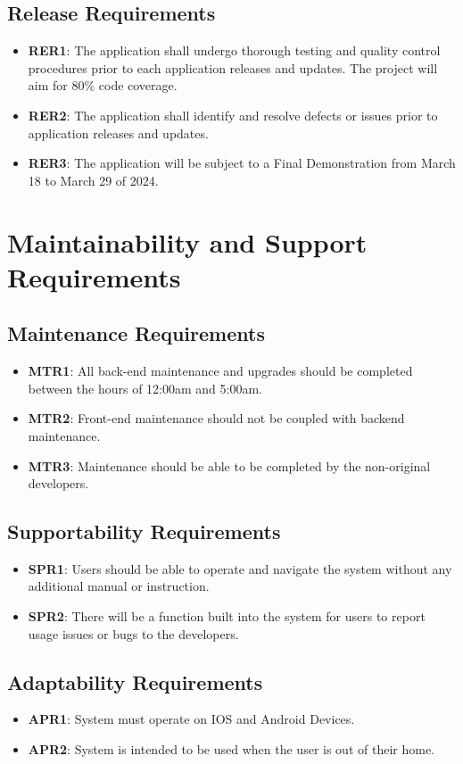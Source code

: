 \documentclass[12pt]{article}
\begin{document}
\subsection{Release Requirements}
\begin{itemize}
    \item \textbf{RER1}: The application shall undergo thorough testing and quality control procedures prior to each application releases and updates. The project will aim for 80\% code coverage.
    \item \textbf{RER2}: The application shall identify and resolve defects or issues prior to application releases and updates.
    \item \textbf{RER3}: The application will be subject to a Final Demonstration from March 18 to March 29 of 2024.
\end{itemize}

\section{Maintainability and Support Requirements}
\subsection{Maintenance Requirements}
\begin{itemize}
  \item \textbf{MTR1}: All back-end maintenance and upgrades should be completed between the hours of 12:00am and 5:00am.
  \item \textbf{MTR2}: Front-end maintenance should not be coupled with backend maintenance.
  \item \textbf{MTR3}: Maintenance should be able to be completed by the non-original developers.
\end{itemize}
\subsection{Supportability Requirements}
\begin{itemize}
  \item \textbf{SPR1}: Users should be able to operate and navigate the system without any additional manual or instruction.
  \item \textbf{SPR2}: There will be a function built into the system for users to report usage issues or bugs to the developers.
\end{itemize}
\subsection{Adaptability Requirements}
\begin{itemize}
  \item \textbf{APR1}: System must operate on IOS and Android Devices.
  \item \textbf{APR2}: System is intended to be used when the user is out of their home. 
\end{itemize}
\end{document}
